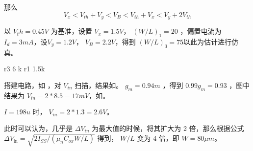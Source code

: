 \documentclass[lang=cn,11pt,a4paper,cite=authoryear]{elegantpaper}
\begin{document}
那么 \[V_x < V_{th} + V_y < V_B < V_{th} + V_x < V_y + 2 V_{th}\]

以 \(V_th = 0.45 V\) 为基准，设置 \(V_x = 1.5 V\)， \((W/L)_1 = 20\) ，偏置电流为 \(I_d = 3 mA\)，设\(V_y = 1.2 V\)， \(V_B  = 2.2 V\)，得到 \((W/L)_3 = 75\)以此为估计进行仿真。

r3 6 k r1 1.5k



搭建电路，如 ，对 \(V_{in}\) 扫描，结果如。 \(g_m = 0.94 m\) ，得到 \(0.99 g_m = 0.93\) ，图中结果为 \(V_{in} = 2 *8.5 = 17 mV\)，如。


\(I = 198 u\) 时， \(V_{in} = 2 * 1.3 = 2.6 V\)。



此时可以认为，几乎是 \(\Delta V_{in}\) 为最大值的时候，将其扩大为 2 倍，那么根据公式 $\Delta V_{\text {in}}=\sqrt{2 I_{S S} /\left(\mu_{n} C_{o x} W / L\right)}$ 得到， \(W/L\) 变为 4 倍，即 \(W = 80 \mu m\)。




\end{document}
